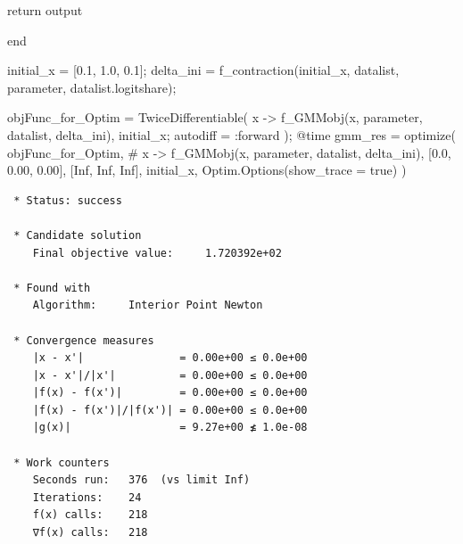 \documentclass[
  letterpaper,
  DIV=11,
  numbers=noendperiod]{scrreprt}
\newenvironment{Shaded}{\begin{snugshade}}{\end{snugshade}}
\newcommand{\CommentTok}[1]{\textcolor[rgb]{0.37,0.37,0.37}{#1}}
\newcommand{\ConstantTok}[1]{\textcolor[rgb]{0.56,0.35,0.01}{#1}}
\newcommand{\ControlFlowTok}[1]{\textcolor[rgb]{0.00,0.23,0.31}{#1}}
\newcommand{\FloatTok}[1]{\textcolor[rgb]{0.68,0.00,0.00}{#1}}
\newcommand{\FunctionTok}[1]{\textcolor[rgb]{0.28,0.35,0.67}{#1}}
\newcommand{\KeywordTok}[1]{\textcolor[rgb]{0.00,0.23,0.31}{#1}}
\newcommand{\NormalTok}[1]{\textcolor[rgb]{0.00,0.23,0.31}{#1}}
\newcommand{\OperatorTok}[1]{\textcolor[rgb]{0.37,0.37,0.37}{#1}}
\newcommand{\PreprocessorTok}[1]{\textcolor[rgb]{0.68,0.00,0.00}{#1}}
\begin{document}
\begin{Shaded}
\begin{Highlighting}[]
    \ControlFlowTok{return}\NormalTok{ output}
    
\KeywordTok{end}    
    
\NormalTok{initial\_x }\OperatorTok{=}\NormalTok{ [}\FloatTok{0.1}\NormalTok{, }\FloatTok{1.0}\NormalTok{, }\FloatTok{0.1}\NormalTok{];}
\NormalTok{delta\_ini }\OperatorTok{=} \FunctionTok{f\_contraction}\NormalTok{(initial\_x, datalist, parameter, datalist.logitshare);}
\end{Highlighting}
\end{Shaded}

\begin{Shaded}
\begin{Highlighting}[]
\NormalTok{objFunc\_for\_Optim }\OperatorTok{=} \FunctionTok{TwiceDifferentiable}\NormalTok{(}
\NormalTok{    x }\OperatorTok{{-}\textgreater{}} \FunctionTok{f\_GMMobj}\NormalTok{(x, parameter, datalist, delta\_ini),}
\NormalTok{    initial\_x;}
\NormalTok{    autodiff }\OperatorTok{=} \OperatorTok{:}\NormalTok{forward}
\NormalTok{    );}
\PreprocessorTok{@time}\NormalTok{ gmm\_res }\OperatorTok{=} \FunctionTok{optimize}\NormalTok{(}
\NormalTok{    objFunc\_for\_Optim,}
\CommentTok{\#     x {-}\textgreater{} f\_GMMobj(x, parameter, datalist, delta\_ini),}
\NormalTok{    [}\FloatTok{0.0}\NormalTok{, }\FloatTok{0.00}\NormalTok{, }\FloatTok{0.00}\NormalTok{],}
\NormalTok{    [}\ConstantTok{Inf}\NormalTok{, }\ConstantTok{Inf}\NormalTok{, }\ConstantTok{Inf}\NormalTok{],}
\NormalTok{    initial\_x,}
\NormalTok{    Optim.}\FunctionTok{Options}\NormalTok{(show\_trace }\OperatorTok{=} \ConstantTok{true}\NormalTok{)}
\NormalTok{)}
\end{Highlighting}
\end{Shaded}

\begin{verbatim}
 * Status: success

 * Candidate solution
    Final objective value:     1.720392e+02

 * Found with
    Algorithm:     Interior Point Newton

 * Convergence measures
    |x - x'|               = 0.00e+00 ≤ 0.0e+00
    |x - x'|/|x'|          = 0.00e+00 ≤ 0.0e+00
    |f(x) - f(x')|         = 0.00e+00 ≤ 0.0e+00
    |f(x) - f(x')|/|f(x')| = 0.00e+00 ≤ 0.0e+00
    |g(x)|                 = 9.27e+00 ≰ 1.0e-08

 * Work counters
    Seconds run:   376  (vs limit Inf)
    Iterations:    24
    f(x) calls:    218
    ∇f(x) calls:   218
\end{verbatim}
\end{document}
